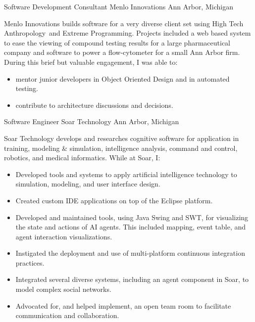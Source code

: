 \documentclass[11pt,letterpaper]{moderncv}
\begin{document}
  {Software Development Consultant}
         {Menlo Innovations} {Ann Arbor, Michigan} {}
{
  Menlo Innovations builds software for a very diverse client set
  using High Tech Anthropology\textregistered \ and Extreme
  Programming.  Projects included a web based system to ease the
  viewing of compound testing results for a large pharmaceutical
  company and software to power a flow-cytometer for a small Ann Arbor
  firm.\newline
  During this brief but valuable engagement, I was able to:
  \begin{itemize}
    \item mentor junior developers in Object Oriented Design and in
      automated testing.
    \item contribute to architecture discussions and decisions.
  \end{itemize}
}

 {Software Engineer} {Soar Technology}
         {Ann Arbor, Michigan} {}
{
  Soar Technology develops and researches cognitive software for
  application in training, modeling \& simulation, intelligence
  analysis, command and control, robotics, and medical
  informatics.\newline
  While at Soar, I:
  \begin{itemize}
  \item Developed tools and systems to apply artificial intelligence
    technology to simulation, modeling, and user interface design.
   \item Created custom IDE applications on top of the Eclipse platform.
   \item Developed and maintained tools, using Java Swing and SWT, for
     visualizing the state and actions of AI agents. This included
     mapping, event table, and agent interaction visualizations.
   \item Instigated the deployment and use of multi-platform
     continuous integration practices.
   \item Integrated several diverse systems, including an agent
     component in Soar, to model complex social networks.
   \item Advocated for, and helped implement, an open team room to
     facilitate communication and collaboration.
  \end{itemize}
}
\end{document}
